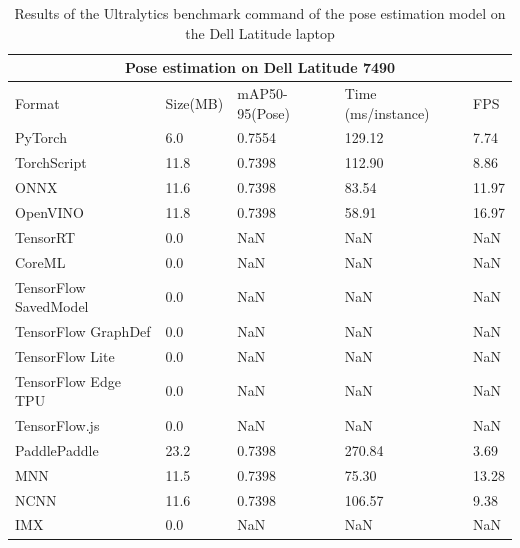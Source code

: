 \documentclass[12pt]{article}
\begin{document}
\begin{table}[H]
  \centering
  \begin{tabular}{ |p{3cm}|p{2cm}|p{2cm}|p{3cm}|p{2cm}|  }
    \hline
    \multicolumn{5}{|c|}{Pose estimation on Dell Latitude 7490} \\
    \hline
    Format& Size(MB) &mAP50-95(Pose) &Time (ms/instance) &FPS\\
    \hline
    PyTorch & 6.0  &  0.7554 & 129.12 & 7.74 \\
    TorchScript & 11.8 & 0.7398 & 112.90 & 8.86 \\
    ONNX & 11.6 & 0.7398 & 83.54 & 11.97 \\
    OpenVINO & 11.8 & 0.7398 & 58.91 & 16.97 \\
    TensorRT & 0.0 & NaN & NaN & NaN \\
    CoreML & 0.0 & NaN & NaN & NaN \\
    TensorFlow SavedModel & 0.0 & NaN & NaN & NaN \\
    TensorFlow GraphDef & 0.0 & NaN & NaN & NaN \\
    TensorFlow Lite & 0.0 & NaN & NaN & NaN \\
    TensorFlow Edge TPU & 0.0 & NaN & NaN & NaN \\
    TensorFlow.js & 0.0 & NaN & NaN & NaN \\
    PaddlePaddle & 23.2 & 0.7398 & 270.84 & 3.69 \\
    MNN & 11.5 & 0.7398 & 75.30 & 13.28 \\
    NCNN & 11.6 & 0.7398 & 106.57 & 9.38 \\
    IMX & 0.0 & NaN & NaN & NaN \\
    \hline
  \end{tabular}
  \caption{Results of the Ultralytics benchmark command of the pose estimation model on the Dell Latitude laptop}
  \label{table:pedl}
\end{table}
\end{document}
